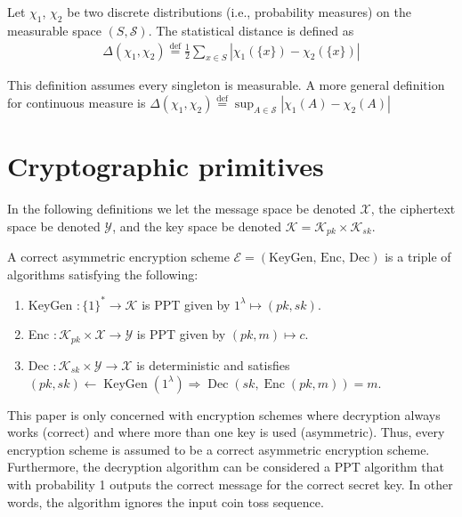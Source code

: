 \begin{definition}
    Let $\chi_1$, $\chi_2$ be two discrete distributions (i.e., probability measures) on the measurable space $(S, \mathcal{S})$. The statistical distance is defined as
    \begin{equation*}
    \begin{aligned}
        \Delta(\chi_1, \chi_2) \stackrel{\mathrm{def}}{=} \frac{1}{2} \sum_{x \in S} |\chi_1(\{x\}) - \chi_2(\{x\})|
    \end{aligned}
    \end{equation*}
\end{definition}
\begin{remark}
    This definition assumes every singleton is measurable. A more general definition for continuous measure is $\Delta(\chi_1, \chi_2) \stackrel{\mathrm{def}}{=} \sup _{A \in \mathcal{S}}|\chi_1(A)-\chi_2(A)|$ 
\end{remark}



\section{Cryptographic primitives}

In the following definitions we let the message space be denoted $\mathcal{X}$, the ciphertext space be denoted $\mathcal{Y}$, and the key space be denoted $\mathcal{K} = \mathcal{K}_{pk} \times \mathcal{K}_{sk}$.

\begin{definition}
A correct asymmetric encryption scheme $\mathcal{E} = (\text{KeyGen, Enc, Dec})$ is a triple of algorithms satisfying the following:
\begin{enumerate}[label={$\bullet$}]
    \item KeyGen $\colon \{1\}^* \to \mathcal{K}$ is PPT given by $1^{\lambda} \mapsto (pk,sk)$.
    \item Enc $\colon \mathcal{K}_{pk} \times \mathcal{X} \to \mathcal{Y}$ is PPT given by $(pk,m) \mapsto c$.
    \item Dec $\colon \mathcal{K}_{sk} \times \mathcal{Y} \to \mathcal{X}$ is deterministic and satisfies $(pk, sk) \leftarrow \operatorname{KeyGen}(1^{\lambda}) \Rightarrow \operatorname{Dec}(sk, \operatorname{Enc}(pk,m)) = m$.
\end{enumerate}
\end{definition}
\begin{remark}
This paper is only concerned with encryption schemes where decryption always works (correct) and where more than one key is used (asymmetric). Thus, every encryption scheme is assumed to be a correct asymmetric encryption scheme. Furthermore, the decryption algorithm can be considered a PPT algorithm that with probability 1 outputs the correct message for the correct secret key. In other words, the algorithm ignores the input coin toss sequence.
\end{remark}

